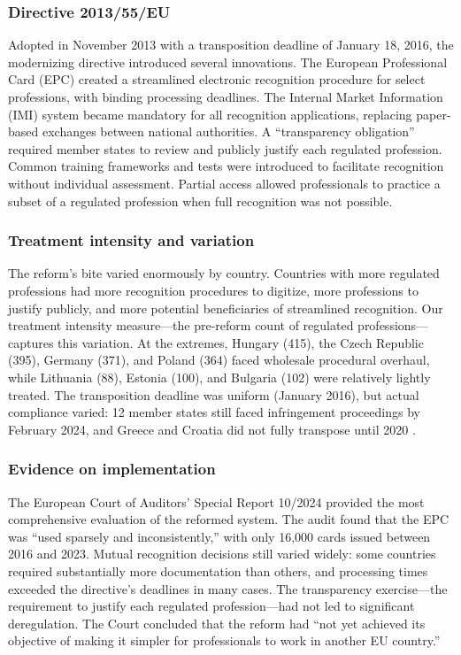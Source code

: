 \documentclass[12pt]{article}
\begin{document}
\subsubsection*{Directive 2013/55/EU} Adopted in November 2013 with a transposition deadline of January 18, 2016, the modernizing directive introduced several innovations. The European Professional Card (EPC) created a streamlined electronic recognition procedure for select professions, with binding processing deadlines. The Internal Market Information (IMI) system became mandatory for all recognition applications, replacing paper-based exchanges between national authorities. A ``transparency obligation'' required member states to review and publicly justify each regulated profession. Common training frameworks and tests were introduced to facilitate recognition without individual assessment. Partial access allowed professionals to practice a subset of a regulated profession when full recognition was not possible.

\subsubsection*{Treatment intensity and variation} The reform's bite varied enormously by country. Countries with more regulated professions had more recognition procedures to digitize, more professions to justify publicly, and more potential beneficiaries of streamlined recognition. Our treatment intensity measure---the pre-reform count of regulated professions---captures this variation. At the extremes, Hungary (415), the Czech Republic (395), Germany (371), and Poland (364) faced wholesale procedural overhaul, while Lithuania (88), Estonia (100), and Bulgaria (102) were relatively lightly treated. The transposition deadline was uniform (January 2016), but actual compliance varied: 12 member states still faced infringement proceedings by February 2024, and Greece and Croatia did not fully transpose until 2020 \citep{eca2024}.

\subsubsection*{Evidence on implementation} The European Court of Auditors' Special Report 10/2024 provided the most comprehensive evaluation of the reformed system. The audit found that the EPC was ``used sparsely and inconsistently,'' with only 16,000 cards issued between 2016 and 2023. Mutual recognition decisions still varied widely: some countries required substantially more documentation than others, and processing times exceeded the directive's deadlines in many cases. The transparency exercise---the requirement to justify each regulated profession---had not led to significant deregulation. The Court concluded that the reform had ``not yet achieved its objective of making it simpler for professionals to work in another EU country.''
\end{document}
